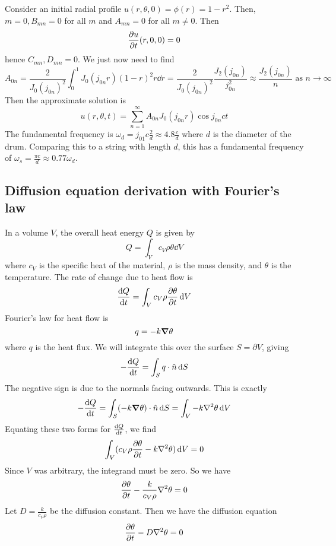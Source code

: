 \begin{example}
	Consider an initial radial profile \( u(r,\theta,0) = \phi(r) = 1 - r^2 \).
	Then, \( m = 0, B_{mn} = 0 \) for all \( m \) and \( A_{mn} = 0 \) for all \( m \neq 0 \).
	Then
	\[
		\pdv{u}{t}\qty(r,0,0) = 0
	\]
	hence \( C_{mn}, D_{mn} = 0 \).
	We just now need to find
	\[
		A_{0n} = \frac{2}{J_0(j_{0n})^2} \int_0^1 J_0(j_{0n}r)(1-r)^2 r\dd{r} = \frac{2}{J_0(j_{0n})^2} \frac{J_2(j_{0n})}{j_{0n}^2} \approx \frac{J_2(j_{0n})}{n} \text{ as } n \to \infty
	\]
	Then the approximate solution is
	\[
		u(r,\theta,t) = \sum_{n=1}^\infty A_{0n} J_0(j_{0n}r)\cos j_{0n} ct
	\]
	The fundamental frequency is \( \omega_d = j_{01} c \frac{2}{d} \approx 4.8\frac{c}{d} \) where \( d \) is the diameter of the drum.
	Comparing this to a string with length \( d \), this has a fundamental frequency of \( \omega_s = \frac{\pi c}{d} \approx 0.77 \omega_d \).
\end{example}

\subsection{Diffusion equation derivation with Fourier's law}
In a volume \( V \), the overall heat energy \( Q \) is given by
\[
	Q = \int_V c_V \rho \theta \dd{V}
\]
where \( c_V \) is the specific heat of the material, \( \rho \) is the mass density, and \( \theta \) is the temperature.
The rate of change due to heat flow is
\[
	\dv{Q}{t} = \int_V c_V \rho \pdv{\theta}{t} \dd{V}
\]
Fourier's law for heat flow is
\[
	q = -k \grad{\theta}
\]
where \( q \) is the heat flux.
We will integrate this over the surface \( S = \partial V \), giving
\[
	-\dv{Q}{t} = \int_S q \cdot \hat n \dd{S}
\]
The negative sign is due to the normals facing outwards.
This is exactly
\[
	-\dv{Q}{t} = \int_S (-k \grad{\theta}) \cdot \hat n \dd{S} = \int_V -k \laplacian{\theta} \dd{V}
\]
Equating these two forms for \( \dv{Q}{t} \), we find
\[
	\int_V (c_V \rho \pdv{\theta}{t} - k \laplacian{\theta}) \dd{V} = 0
\]
Since \( V \) was arbitrary, the integrand must be zero.
So we have
\[
	\pdv{\theta}{t} - \frac{k}{c_V \rho} \laplacian{\theta} = 0
\]
Let \( D = \frac{k}{c_V \rho} \) be the diffusion constant.
Then we have the diffusion equation
\[
	\pdv{\theta}{t} - D \laplacian{\theta} = 0
\]

